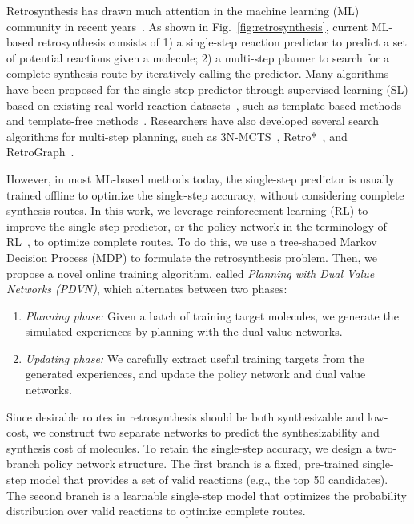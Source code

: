 \documentclass[nohyperref]{article}
\theoremstyle{plain}
\theoremstyle{definition}
\theoremstyle{remark}
\begin{document}
Retrosynthesis has drawn much attention in the machine learning (ML) community in recent years~\cite{Segler2018PlanningCS, dl4retro_survey}. 
As shown in Fig.~\ref{fig:retrosynthesis}, current ML-based retrosynthesis consists of 
1) a single-step reaction predictor to predict a set of potential reactions given a molecule; 
2) a multi-step planner to search for a complete synthesis route by iteratively calling the predictor. 
Many algorithms have been proposed for the single-step predictor through
supervised learning (SL) based on existing real-world reaction datasets~\cite{lowe2012extraction}, such as template-based methods~\cite{segler2017neural, coley2017retrosim, dai2019retrosynthesis} and template-free methods~\cite{liu2017s2s, tetko2020state}. 
Researchers have also developed several search algorithms for multi-step planning, such as 3N-MCTS~\cite{Segler2018PlanningCS}, Retro*~\cite{chen20retrostar}, and RetroGraph~\cite{xie2022retrograph}.












However, in most ML-based methods today, the single-step predictor is usually trained offline to optimize the single-step accuracy, without considering complete synthesis routes. 
In this work, we leverage reinforcement learning (RL)  
to improve the single-step predictor, 
or the policy network in the terminology of RL~\cite{sutton2018reinforcement, dac2021},
to optimize complete routes.
To do this, we use a tree-shaped Markov Decision Process (MDP) to formulate the retrosynthesis problem.
Then, we propose a novel online training algorithm, called \textit{Planning with Dual Value Networks (PDVN)}, which alternates between two phases:
\begin{enumerate}
\item \textit{Planning phase:} Given a batch of training target molecules, 
we generate the simulated experiences by planning with the dual value networks.
\item \textit{Updating phase:} We carefully extract useful training targets from the generated experiences, and update the policy network and dual value networks.
\end{enumerate}

Since desirable routes in retrosynthesis should be both synthesizable and low-cost, we construct two separate networks 
to predict the synthesizability and synthesis cost of molecules.
To retain the single-step accuracy, we design a two-branch policy network structure. 
The first branch is a fixed, pre-trained single-step model that provides a set of valid reactions (e.g., the top 50 candidates). The second branch is a learnable single-step model that optimizes the probability distribution over valid reactions to optimize complete routes.
\end{document}
